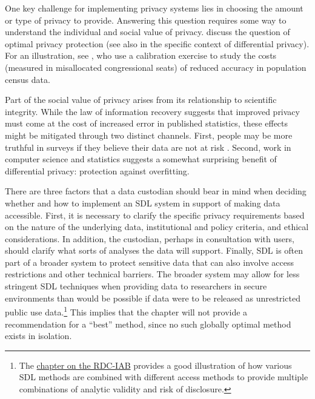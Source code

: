 One key challenge for implementing privacy systems lies in choosing the amount or type of privacy to provide. Answering this question requires some way to understand the individual and social value of privacy. \citet{abowd_economic_2019} discuss the question of optimal privacy protection (see also \citet{hsu_differential_2014} in the specific context of differential privacy). For an illustration, see \citet{spencer_effects_2015}, who use a calibration exercise to study the costs (measured in misallocated congressional seats) of reduced accuracy in population census data.

Part of the social value of privacy arises from its relationship to scientific integrity. While the law of information recovery suggests that improved privacy must come at the cost of increased error in published statistics, these effects might be mitigated through two distinct channels. First, people may be more truthful in surveys if they believe their data are not at risk \citep{couper_risk_2008}. Second, work in computer science and statistics \citep{dwork_generalization_2015, dwork_fienberg_2018, cummings_adaptive_2016} suggests a somewhat surprising benefit of differential privacy: protection against overfitting.

There are three factors that a data custodian should bear in mind when deciding whether and how to implement an SDL system in support of making data accessible. First, it is necessary to clarify the specific privacy requirements based on the nature of the underlying data, institutional and policy criteria, and ethical considerations. In addition, the custodian, perhaps in consultation with users, should clarify what sorts of analyses the data will support. Finally, SDL is often part of a broader system to protect sensitive data that can also involve access restrictions and other technical barriers. The broader system may allow for less stringent SDL techniques when providing data to researchers in secure environments than would be possible if data were to be released as unrestricted public use data.\footnote{The \protect\hyperlink{iab}{chapter on the RDC-IAB} provides a good illustration of how various SDL methods are combined with different access methods to provide multiple combinations of analytic validity and risk of disclosure.} This implies that the chapter will not provide a recommendation for a ``best'' method, since no such globally optimal method exists in isolation.

